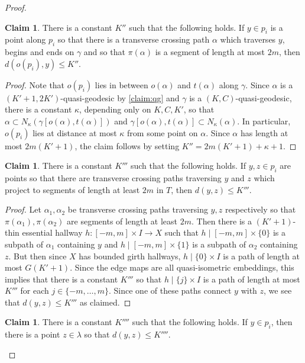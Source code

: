 \documentclass[11pt, a4paper]{amsart}
\theoremstyle{definition}
\newtheorem{claim}[theorem]{Claim}
\begin{document}
\begin{proof}
\begin{claim}
\label{claim:short_path}
There is a constant $K''$ such that the following holds. If $y\in p_i$ is a point along $p_i$ so that there is a transverse crossing path $\alpha$ which traverses $y$, begins and ends on $\gamma$ and so that $\pi(\alpha)$ is a segment of length at most $2m$, then $d(o(p_i), y)\leqslant K''$.
\end{claim}

\begin{proof}
Note that $o(p_i)$ lies in between $o(\alpha)$ and $t(\alpha)$ along $\gamma$. Since $\alpha$ is a $(K'+1, 2K')$-quasi-geodesic by \cref{claim:qg} and $\gamma$ is a $(K, C)$-quasi-geodesic, there is a constant $\kappa$, depending only on $K, C, K'$, so that $\alpha\subset N_{\kappa}(\gamma[o(\alpha), t(\alpha)])$ and $\gamma[o(\alpha), t(\alpha)]\subset N_{\kappa}(\alpha)$. In particular, $o(p_i)$ lies at distance at most $\kappa$ from some point on $\alpha$. Since $\alpha$ has length at most $2m(K'+1)$, the claim follows by setting $K'' = 2m(K'+1) + \kappa + 1$.
\end{proof}

\begin{claim}
\label{claim:thin_hallway}
There is a constant $K'''$ such that the following holds. If $y, z\in p_i$ are points so that there are transverse crossing paths traversing $y$ and $z$ which project to segments of length at least $2m$ in $T$, then $d(y, z)\leqslant K'''$.
\end{claim}

\begin{proof}
Let $\alpha_1, \alpha_2$ be transverse crossing paths traversing $y, z$ respectively so that $\pi(\alpha_1), \pi(\alpha_2)$ are segments of length at least $2m$. Then there is a $(K'+1)$-thin essential hallway $h\colon [-m, m]\times I\to X$ such that $h\mid [-m, m]\times \{0\}$ is a subpath of $\alpha_1$ containing $y$ and $h\mid[-m, m]\times\{1\}$ is a subpath of $\alpha_2$ containing $z$. But then since $X$ has bounded girth hallways, $h\mid \{0\}\times I$ is a path of length at most $G(K'+1)$. Since the edge maps are all quasi-isometric embeddings, this implies that there is a constant $K'''$ so that $h\mid \{j\}\times I$ is a path of length at most $K'''$ for each $j\in \{-m, \ldots, m\}$. Since one of these paths connect $y$ with $z$, we see that $d(y, z)\leqslant K'''$ as claimed.
\end{proof}

\begin{claim}
\label{claim:final_claim}
There is a constant $K''''$ such that the following holds. If $y\in p_i$, then there is a point $z\in \lambda$ so that $d(y, z)\leqslant K''''$.
\end{claim}


\end{proof}
\end{document}
